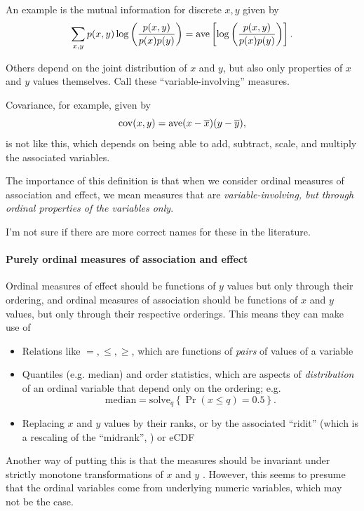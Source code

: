 \documentclass[
  11pt,
  fleqn
]{article}
\begin{document}
\begin{itemize}
    An example is the mutual information for discrete $x, y$ given by
    \[ \sum_{x,
      y} p(x, y) \log\left(\frac{p(x, y)}{p(x) p(y)}\right) = \mathrm{ave} \left[
    \log\left(\frac{p(x, y)}{p(x) p(y)}\right) \right]. \]

    Others depend on the joint distribution of $x$ and $y$, but also
    only properties of $x$ and $y$ values themselves. Call these
    ``variable-involving'' measures.

    Covariance, for example, given by
    \[\mathrm{cov}(x, y) = \mathrm{ave} (x - \overline{x})(y - \overline{y}),\] is
    not like this,
    which depends on being able to add, subtract, scale, and
    multiply the associated variables.

    The importance of this definition is that when we consider
    ordinal measures of association and effect, we mean measures that
    are \emph{variable-involving, but through ordinal properties of
    the variables only}.

\end{itemize}

I'm not sure if there are more correct names for these in the literature.

\paragraph{Purely ordinal measures of association and effect} Ordinal measures
of effect should be functions of $y$ values but only through their ordering,
and ordinal measures of association should be functions of $x$ and
$y$ values, but only through their respective orderings. This means
they can make use of
\begin{itemize}
  \item Relations like $=, \leq, \geq$, which are functions of
    \emph{pairs} of values of a variable
  \item Quantiles (e.g. median) and order statistics, which are
    aspects of \emph{distribution} of an ordinal variable that depend
    only on the ordering; e.g. \[\text{median} = \text{solve}_q \left\{\Pr(x
    \leq q) = 0.5\right\}. \]
  \item Replacing $x$ and $y$ values by their ranks, or by the
    associated ``ridit'' (which is a rescaling of the ``midrank'',
    \citet{agrestiAnalysisOrdinalCategorical2010}) or eCDF
\end{itemize}

Another way of putting this
is that the measures should be
invariant under strictly monotone transformations of $x$ and $y$
\citep{kruskalOrdinalMeasuresAssociation1958}. However, this seems to
presume that the ordinal variables come from underlying numeric
variables, which may not be the case.
\end{document}
